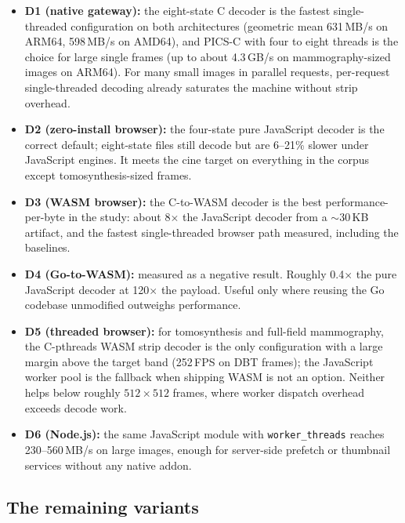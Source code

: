 \documentclass[journal]{IEEEtran}
\begin{document}
\begin{itemize}
  \item \textbf{D1 (native gateway):} the eight-state C decoder is the
  fastest single-threaded configuration on both architectures
  (geometric mean 631\,MB/s on ARM64, 598\,MB/s on AMD64), and PICS-C with
  four to eight threads is the choice for large single frames (up to about
  4.3\,GB/s on mammography-sized images on ARM64). For many small images in
  parallel requests, per-request single-threaded decoding already saturates
  the machine without strip overhead.
  \item \textbf{D2 (zero-install browser):} the four-state pure JavaScript
  decoder is the correct default; eight-state files still decode but are
  6--21\% slower under JavaScript engines. It meets the cine target on
  everything in the corpus except tomosynthesis-sized frames.
  \item \textbf{D3 (WASM browser):} the C-to-WASM decoder is the best
  performance-per-byte in the study: about 8$\times$ the JavaScript decoder
  from a ${\sim}$30\,KB artifact, and the fastest single-threaded browser
  path measured, including the baselines.
  \item \textbf{D4 (Go-to-WASM):} measured as a negative result. Roughly
  0.4$\times$ the pure JavaScript decoder at 120$\times$ the payload. Useful
  only where reusing the Go codebase unmodified outweighs performance.
  \item \textbf{D5 (threaded browser):} for tomosynthesis and full-field
  mammography, the C-pthreads WASM strip decoder is the only configuration
  with a large margin above the target band (252\,FPS on DBT frames); the
  JavaScript worker pool is the fallback when shipping WASM is not an
  option. Neither helps below roughly $512{\times}512$ frames, where worker
  dispatch overhead exceeds decode work.
  \item \textbf{D6 (Node.js):} the same JavaScript module with
  \texttt{worker\_threads} reaches 230--560\,MB/s on large images, enough
  for server-side prefetch or thumbnail services without any native addon.
\end{itemize}

\subsection{The remaining variants}
\end{document}
